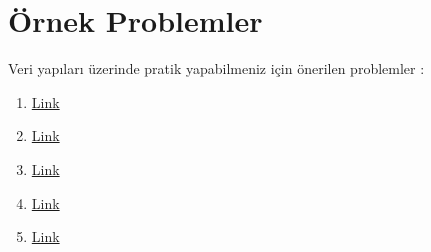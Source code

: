 \documentclass[12pt]{article}
\begin{document}
    \section{\"{O}rnek Problemler}
    
    Veri yap{\i}lar{\i} \"{u}zerinde pratik yapabilmeniz i\c{c}in \"{o}nerilen problemler :
    \begin{enumerate}
        \item \href{https://codeforces.com/problemset/problem/797/C}{Link}
        \item \href{https://codeforces.com/contest/276/problem/C}{Link}
        \item \href{https://codeforces.com/contest/380/problem/C}{Link}
        \item \href{https://www.hackerearth.com/problem/algorithm/benny-and-sum-2/}{Link}
        \item \href{https://www.hackerearth.com/practice/data-structures/advanced-data-structures/fenwick-binary-indexed-trees/practice-problems/algorithm/counting-in-byteland/}{Link}
    \end{enumerate}
    
    \newpage
    
\end{document}
